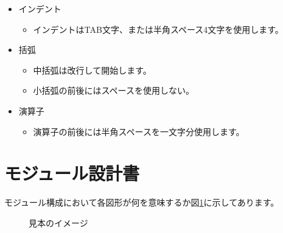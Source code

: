 \documentclass[a4j]{jarticle}
\begin{document}
\begin{itemize}
  \item インデント
  \begin{itemize}
    \item インデントはTAB文字、または半角スペース4文字を使用します。
  \end{itemize}

  \item 括弧
  \begin{itemize}
    \item 中括弧は改行して開始します。
    \item 小括弧の前後にはスペースを使用しない。
  \end{itemize}

  \item 演算子
  \begin{itemize}
    \item 演算子の前後には半角スペースを一文字分使用します。
  \end{itemize}

\end{itemize}

\section{モジュール設計書}
モジュール構成において各図形が何を意味するか図\ref{sample}に示してあります。


\begin{figure}[H]
    \begin{center}
    \caption {見本のイメージ}
    \label{sample}
    \end{center}
\end{figure}
\end{document}
